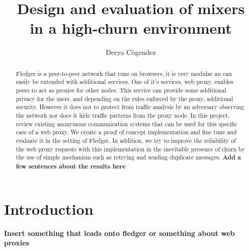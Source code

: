 \documentclass[a4paper,11pt,oneside]{report}
\title{Design and evaluation of mixers\\in a high-churn environment}
\author{Derya Cögendez}
\begin{document}
\maketitle
\makeacks

\begin{abstract}
Fledger is a peer-to-peer network that runs on browsers, it is very modular an can easily be extended with additional services. One of it's services, web proxy, enables peers to act as proxies for other nodes. This service can provide some additional privacy for the users, and depending on the rules enforced by the proxy, additional security. However it does not to protect from traffic analysis by an adversary observing the network nor does it hide traffic patterns from the proxy node. In this project, review existing anonymous communication systems that can be used for this specific case of a web proxy. We create a proof of concept implementation and fine tune and evaluate it in the setting of Fledger. In addition, we try to improve the reliability of the web proxy requests with this implementation in the inevitable presence of churn by the use of simple mechanism such as retrying and sending duplicate messages.
\textbf{Add a few sentences about the results here}
\end{abstract}

\maketoc

\chapter{Introduction}

\textbf{Insert something that leads onto fledger or something about web proxies}
\end{document}
